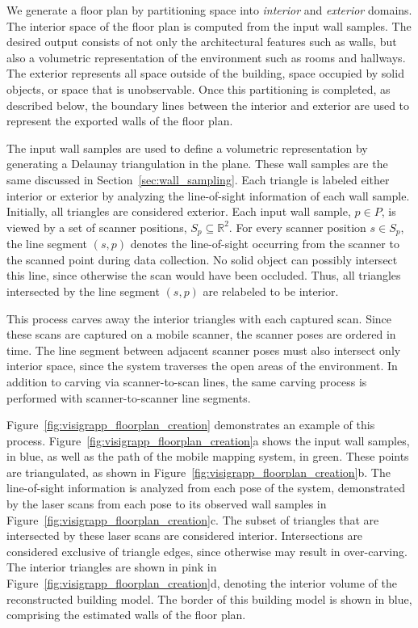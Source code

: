 \documentclass[12pt,onecolumn,oneside]{book}
\begin{document}
We generate a floor plan by partitioning space into {\it interior} and {\it exterior} domains.  The interior space of the floor plan is computed from the input wall samples.  The desired output consists of not only the architectural features such as walls, but also a volumetric representation of the environment such as rooms and hallways.  The exterior represents all space outside of the building, space occupied by solid objects, or space that is unobservable.  Once this partitioning is completed, as described below, the boundary lines between the interior and exterior are used to represent the exported walls of the floor plan.

The input wall samples are used to define a volumetric representation by generating a Delaunay triangulation in the plane.  These wall samples are the same discussed in Section~\ref{sec:wall_sampling}.  Each triangle is labeled either interior or exterior by analyzing the line-of-sight information of each wall sample.  Initially, all triangles are considered exterior.  Each input wall sample, $p \in P$, is viewed by a set of scanner positions, $S_p \subseteq \mathbb{R}^2$.  For every scanner position $s \in S_p$, the line segment $(s,p)$ denotes the line-of-sight occurring from the scanner to the scanned point during data collection.  No solid object can possibly intersect this line, since otherwise the scan would have been occluded.  Thus, all triangles intersected by the line segment $(s,p)$ are relabeled to be interior.

This process carves away the interior triangles with each captured scan.  Since these scans are captured on a mobile scanner, the scanner poses are ordered in time.  The line segment between adjacent scanner poses must also intersect only interior space, since the system traverses the open areas of the environment.  In addition to carving via scanner-to-scan lines, the same carving process is performed with scanner-to-scanner line segments.

Figure~\ref{fig:visigrapp_floorplan_creation} demonstrates an example of this process.  Figure~\ref{fig:visigrapp_floorplan_creation}a shows the input wall samples, in blue, as well as the path of the mobile mapping system, in green.  These points are triangulated, as shown in Figure~\ref{fig:visigrapp_floorplan_creation}b.  The line-of-sight information is analyzed from each pose of the system, demonstrated by the laser scans from each pose to its observed wall samples in Figure~\ref{fig:visigrapp_floorplan_creation}c.  The subset of triangles that are intersected by these laser scans are considered interior.  Intersections are considered exclusive of triangle edges, since otherwise may result in over-carving.  The interior triangles are shown in pink in Figure~\ref{fig:visigrapp_floorplan_creation}d, denoting the interior volume of the reconstructed building model.  The border of this building model is shown in blue, comprising the estimated walls of the floor plan.
\end{document}
